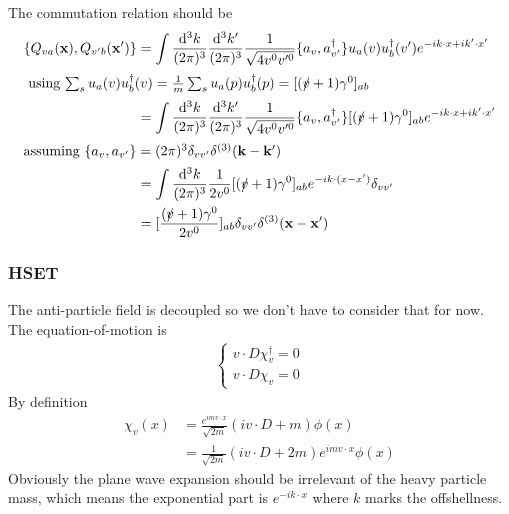 \documentclass{article}
\newcommand{\g}{\gamma}
\begin{document}
The commutation relation should be
\begin{align*}
  \{Q_{va}(\vb{x}),Q_{v'b}(\vb{x'})\}&=\int \frac{\dd^3k}{(2\pi)^3}\frac{\dd^3k'}{(2\pi)^3}\frac{1}{\sqrt{4v^0v'^0}}\{a_v,a_{v'}^{\dagger}\}u_a(v)u_b^{\dagger}(v')e^{-ik\cdot x+ik'\cdot x'}\\
  \intertext{
  using $\sum_s u_a(v)u_b^{\dagger}(v)=\frac{1}{m}\sum_s u_a(p)u^{\dagger}_b(p)=[(\slashed v+1)\g^0]_{ab}$}
  &=\int \frac{\dd^3k}{(2\pi)^3}\frac{\dd^3k'}{(2\pi)^3}\frac{1}{\sqrt{4v^0v'^0}}\{a_v,a_{v'}^{\dagger}\}[(\slashed v+1)\g^0]_{ab}e^{-ik\cdot x+ik'\cdot x'}\\
  \intertext{assuming $\{a_v,a_{v'}\}=(2\pi)^3\delta_{vv'}\delta^{(3)}(\vb{k-k'})$}
  &=\int \frac{\dd^3k}{(2\pi)^3}\frac{1}{2v^0}[(\slashed v+1)\g^0]_{ab}e^{-ik\cdot (x-x')}\delta_{vv'}\\
  &=[\frac{(\slashed v+1)\g^0}{2v^0}]_{ab}\delta_{vv'}\delta^{(3)}(\vb{x-x'})
\end{align*}
\subsubsection{HSET}
The anti-particle field is decoupled so we don't have to consider that for now. The equation-of-motion is
\begin{align*}
  \begin{cases}
	v\cdot D\chi_v^{\dagger}=0\\
	v\cdot D\chi_v=0
  \end{cases}
\end{align*}
By definition
\begin{align*}
  \chi_v(x)&=\frac{e^{imv\cdot x}}{\sqrt{2m}}(iv\cdot D+m)\phi(x)\\
  &=\frac{1}{\sqrt{2m}}(iv\cdot D+2m)e^{imv\cdot x}\phi(x)
\end{align*}
Obviously the plane wave expansion should be irrelevant of the heavy particle mass, which means the exponential part is $e^{-ik\cdot x}$ where $k$ marks the offshellness. 
\end{document}
